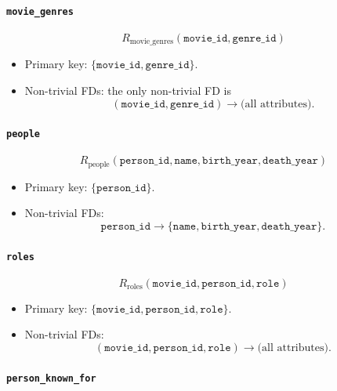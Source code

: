 \documentclass{article}
\begin{document}
\paragraph{\texttt{movie\_genres}}

\[
R_{\text{movie\_genres}}( \texttt{movie\_id}, \texttt{genre\_id} )
\]

\begin{itemize}
    \item Primary key: $\{\texttt{movie\_id}, \texttt{genre\_id}\}$.
    \item Non-trivial FDs: the only non-trivial FD is
    \[
    (\texttt{movie\_id}, \texttt{genre\_id}) \rightarrow \text{(all attributes)}.
    \]
\end{itemize}

\paragraph{\texttt{people}}

\[
R_{\text{people}}( \texttt{person\_id}, \texttt{name}, \texttt{birth\_year}, \texttt{death\_year} )
\]

\begin{itemize}
    \item Primary key: $\{\texttt{person\_id}\}$.
    \item Non-trivial FDs:
    \[
    \texttt{person\_id} \rightarrow \{\texttt{name}, \texttt{birth\_year}, \texttt{death\_year}\}.
    \]
\end{itemize}

\paragraph{\texttt{roles}}

\[
R_{\text{roles}}( \texttt{movie\_id}, \texttt{person\_id}, \texttt{role} )
\]

\begin{itemize}
    \item Primary key: $\{\texttt{movie\_id}, \texttt{person\_id}, \texttt{role}\}$.
    \item Non-trivial FDs:
    \[
    (\texttt{movie\_id}, \texttt{person\_id}, \texttt{role}) \rightarrow \text{(all attributes)}.
    \]
\end{itemize}

\paragraph{\texttt{person\_known\_for}}
\end{document}
